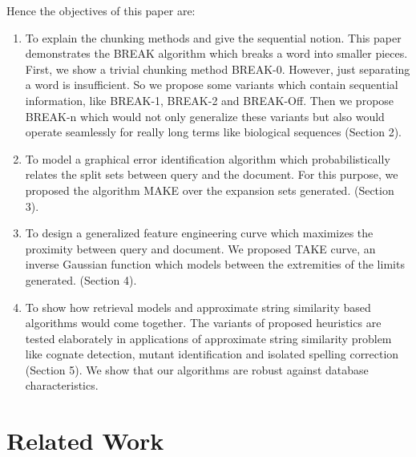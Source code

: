 Hence the objectives of this paper are:
\begin{enumerate}
	\item To explain the chunking methods and give the sequential notion. This paper demonstrates the BREAK algorithm which breaks a word into smaller pieces.
	First, we show a trivial chunking method BREAK-0. However, just separating a word is insufficient. So we propose some variants which contain sequential information, like BREAK-1, BREAK-2 and BREAK-Off. Then we propose BREAK-n which would not only generalize these variants but also would operate seamlessly for really long terms like biological sequences (Section 2).
	\item To model a graphical error identification algorithm which probabilistically relates the split sets between query and the document. For this purpose, we proposed the algorithm MAKE over the expansion sets generated. (Section 3).
	\item To design a generalized feature engineering curve which maximizes the proximity between query and document. We proposed TAKE curve, an inverse Gaussian function which models between the extremities of the limits generated. (Section 4).
	\item To show how retrieval models and approximate string similarity based algorithms would come together. The variants of proposed heuristics are tested elaborately in applications of approximate string similarity problem like cognate detection, mutant identification and isolated spelling correction (Section 5). 
	We show that our algorithms are robust against database characteristics.
\end{enumerate}


\section{Related Work}


